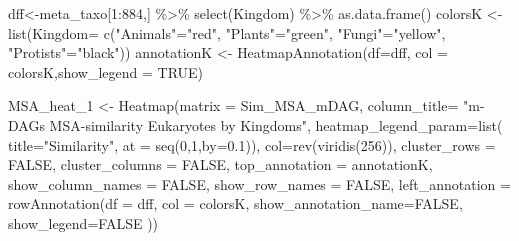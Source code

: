 \documentclass[
  letterpaper,
  DIV=11,
  numbers=noendperiod]{scrreprt}
\newenvironment{Shaded}{}{}
\newcommand{\AttributeTok}[1]{\textcolor[rgb]{0.78,0.47,0.87}{#1}}
\newcommand{\ConstantTok}[1]{\textcolor[rgb]{0.82,0.60,0.40}{#1}}
\newcommand{\DecValTok}[1]{\textcolor[rgb]{0.82,0.60,0.40}{#1}}
\newcommand{\FloatTok}[1]{\textcolor[rgb]{0.82,0.60,0.40}{#1}}
\newcommand{\FunctionTok}[1]{\textcolor[rgb]{0.38,0.69,0.94}{#1}}
\newcommand{\NormalTok}[1]{\textcolor[rgb]{0.67,0.70,0.75}{#1}}
\newcommand{\OtherTok}[1]{\textcolor[rgb]{0.15,0.68,0.38}{#1}}
\newcommand{\SpecialCharTok}[1]{\textcolor[rgb]{0.34,0.71,0.76}{#1}}
\newcommand{\StringTok}[1]{\textcolor[rgb]{0.60,0.76,0.47}{#1}}
\begin{document}
\begin{Shaded}
\begin{Highlighting}[]
\NormalTok{dff}\OtherTok{\textless{}{-}}\NormalTok{meta\_taxo[}\DecValTok{1}\SpecialCharTok{:}\DecValTok{884}\NormalTok{,] }\SpecialCharTok{\%\textgreater{}\%} \FunctionTok{select}\NormalTok{(Kingdom)  }\SpecialCharTok{\%\textgreater{}\%} \FunctionTok{as.data.frame}\NormalTok{()}
\NormalTok{colorsK }\OtherTok{\textless{}{-}} \FunctionTok{list}\NormalTok{(}\AttributeTok{Kingdom=} \FunctionTok{c}\NormalTok{(}\StringTok{"Animals"}\OtherTok{=}\StringTok{"red"}\NormalTok{,}
                           \StringTok{"Plants"}\OtherTok{=}\StringTok{"green"}\NormalTok{,}
                           \StringTok{"Fungi"}\OtherTok{=}\StringTok{"yellow"}\NormalTok{,}
                           \StringTok{"Protists"}\OtherTok{=}\StringTok{"black"}\NormalTok{))}
\NormalTok{annotationK }\OtherTok{\textless{}{-}} \FunctionTok{HeatmapAnnotation}\NormalTok{(}\AttributeTok{df=}\NormalTok{dff, }\AttributeTok{col =}\NormalTok{ colorsK,}\AttributeTok{show\_legend =} \ConstantTok{TRUE}\NormalTok{)}

\NormalTok{MSA\_heat\_1 }\OtherTok{\textless{}{-}} \FunctionTok{Heatmap}\NormalTok{(}\AttributeTok{matrix =}\NormalTok{ Sim\_MSA\_mDAG, }
                      \AttributeTok{column\_title=}
                        \StringTok{"m{-}DAGs MSA{-}similarity Eukaryotes by Kingdoms"}\NormalTok{,}
                      \AttributeTok{heatmap\_legend\_param=}\FunctionTok{list}\NormalTok{(}
                        \AttributeTok{title=}\StringTok{"Similarity"}\NormalTok{,}
                        \AttributeTok{at =} \FunctionTok{seq}\NormalTok{(}\DecValTok{0}\NormalTok{,}\DecValTok{1}\NormalTok{,}\AttributeTok{by=}\FloatTok{0.1}\NormalTok{)),}
                      \AttributeTok{col=}\FunctionTok{rev}\NormalTok{(}\FunctionTok{viridis}\NormalTok{(}\DecValTok{256}\NormalTok{)),}
                      \AttributeTok{cluster\_rows =} \ConstantTok{FALSE}\NormalTok{,}
                      \AttributeTok{cluster\_columns =} \ConstantTok{FALSE}\NormalTok{,}
                      \AttributeTok{top\_annotation =}\NormalTok{ annotationK,}
                      \AttributeTok{show\_column\_names =} \ConstantTok{FALSE}\NormalTok{, }
                      \AttributeTok{show\_row\_names =} \ConstantTok{FALSE}\NormalTok{,}
                      \AttributeTok{left\_annotation =}
                        \FunctionTok{rowAnnotation}\NormalTok{(}\AttributeTok{df =}\NormalTok{ dff,}
                                      \AttributeTok{col =}\NormalTok{ colorsK,}
                                    \AttributeTok{show\_annotation\_name=}\ConstantTok{FALSE}\NormalTok{,}
                                    \AttributeTok{show\_legend=}\ConstantTok{FALSE}
\NormalTok{                                      ))}








\end{Highlighting}
\end{Shaded}
\end{document}
